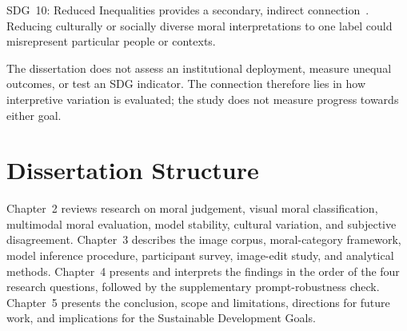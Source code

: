 SDG~10: Reduced Inequalities provides a secondary, indirect connection~\cite{un2015agenda}. Reducing
culturally or socially diverse moral interpretations to one label could
misrepresent particular people or contexts.

The dissertation does not assess an institutional deployment, measure unequal
outcomes, or test an SDG indicator. The connection therefore lies in how
interpretive variation is evaluated; the study does not measure progress
towards either goal.


\section{Dissertation Structure}

Chapter~2 reviews research on moral judgement, visual moral classification,
multimodal moral evaluation, model stability, cultural variation, and
subjective disagreement. Chapter~3 describes the image corpus, moral-category
framework, model inference procedure, participant survey, image-edit study,
and analytical methods. Chapter~4 presents and interprets the findings in the order of the four
research questions, followed by the supplementary prompt-robustness check.
Chapter~5 presents the conclusion, scope and limitations, directions for future
work, and implications for the Sustainable Development Goals.
